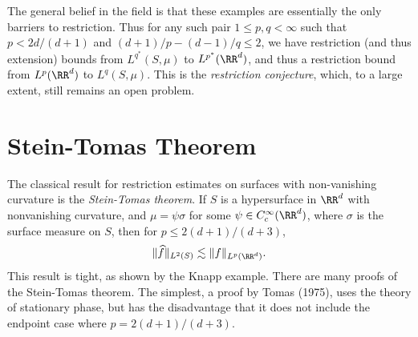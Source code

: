The general belief in the field is that these examples are essentially the only barriers to restriction. Thus for any such pair $1 \leq p,q < \infty$ such that $p < 2d/(d+1)$ and $(d+1)/p - (d-1)/q \leq 2$, we have restriction (and thus extension) bounds from $L^{q^*}(S,\mu)$ to $L^{p^*}(\RR^d)$, and thus a restriction bound from $L^p(\RR^d)$ to $L^q(S,\mu)$. This is the \emph{restriction conjecture}, which, to a large extent, still remains an open problem.



\section{Stein-Tomas Theorem}

The classical result for restriction estimates on surfaces with non-vanishing curvature is the \emph{Stein-Tomas theorem}. If $S$ is a hypersurface in $\RR^d$ with nonvanishing curvature, and $\mu = \psi \sigma$ for some $\psi \in C_c^\infty(\RR^d)$, where $\sigma$ is the surface measure on $S$, then for $p \leq 2(d+1)/(d+3)$,
%
\[ \| \widehat{f} \|_{L^2(S)} \lesssim \| f \|_{L^p(\RR^d)}. \]
%
This result is tight, as shown by the Knapp example. There are many proofs of the Stein-Tomas theorem. The simplest, a proof by Tomas (1975), uses the theory of stationary phase, but has the disadvantage that it does not include the endpoint case where $p = 2(d+1)/(d+3)$.

